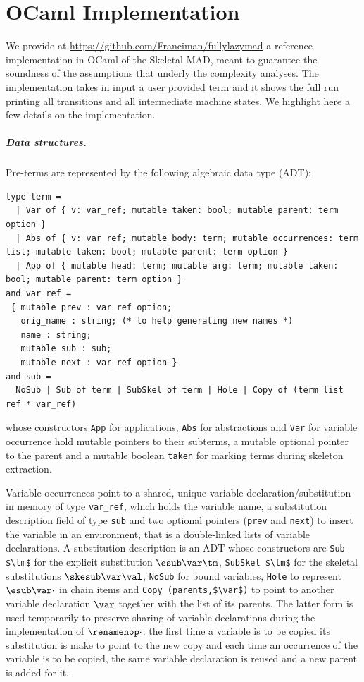 \section{OCaml Implementation}
\label{sect:implementation}

We provide at \url{https://github.com/Franciman/fullylazymad}
a reference implementation in OCaml of the Skeletal MAD,
meant to guarantee the soundness of the assumptions that underly the complexity analyses.
The implementation takes in input a user provided term and it shows the full run printing all transitions and all intermediate machine states. We highlight here a few details on the implementation.

\subparagraph{Data structures.}
Pre-terms are represented by the following algebraic data type (ADT):
\begin{lstlisting}
type term =
  | Var of { v: var_ref; mutable taken: bool; mutable parent: term option }
  | Abs of { v: var_ref; mutable body: term; mutable occurrences: term list; mutable taken: bool; mutable parent: term option }
  | App of { mutable head: term; mutable arg: term; mutable taken: bool; mutable parent: term option }
and var_ref =
 { mutable prev : var_ref option;
   orig_name : string; (* to help generating new names *)
   name : string;
   mutable sub : sub;
   mutable next : var_ref option }
and sub =
  NoSub | Sub of term | SubSkel of term | Hole | Copy of (term list ref * var_ref)
\end{lstlisting}
whose constructors \lstinline{App} for applications, \lstinline{Abs} for abstractions and \lstinline{Var} for variable occurrence hold mutable pointers to their subterms, a mutable optional pointer to the parent and a mutable boolean \lstinline{taken} for marking terms during skeleton extraction.

Variable occurrences point to a shared, unique variable declaration/substitution in memory of type \lstinline{var_ref}, which holds the variable name, a substitution description field of type \lstinline{sub} and two optional pointers (\lstinline{prev} and \lstinline{next}) to insert the variable in an environment, that is a double-linked lists of variable declarations. A substitution description is an ADT whose constructors are \lstinline{Sub $\tm$} for the explicit substitution $\esub\var\tm$, \lstinline{SubSkel $\tm$} for the skeletal substitutions $\skesub\var\val$, \lstinline{NoSub} for bound variables, \lstinline{Hole} to represent $\esub\var\cdot$ in chain items and \lstinline{Copy (parents,$\var$)} to point to another variable declaration $\var$ together with the list of its parents. The latter form is used temporarily to preserve sharing of variable declarations during the implementation of $\renamenop\cdot$: the first time a variable is to be copied its substitution is make to point to the new copy and each time an occurrence of the variable is to be copied, the same variable declaration is reused and a new parent is added for it.

